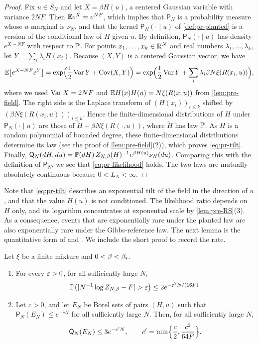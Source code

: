 \begin{proof}
Fix $u\in S_N$ and let $X=\beta H(u)$, a centered Gaussian variable with variance $2NF$. Then $\mathbb E e^{X}=e^{NF}$, which implies that $\mathsf P_N$ is a probability measure whose $u$-marginal is $\nu_N$, and that the kernel $\mathsf P_N(\cdot\mid u)$ of \cref{def:pr-planted} is a version of the conditional law of $H$ given $u$. By definition, $\mathsf P_N(\cdot\mid u)$ has density $e^{X-NF}$ with respect to $\mathbb P$. For points $x_1,\dots,x_k\in\mathbb R^N$ and real numbers $\lambda_1,\dots,\lambda_k$, let $Y=\sum_i\lambda_iH(x_i)$. Because $(X,Y)$ is a centered Gaussian vector, we have
\[
\mathbb E\bigl[e^{X-NF}e^{Y}\bigr]=\exp\Bigl(\frac12\operatorname{Var} Y+\operatorname{Cov}(X,Y)\Bigr)=\exp\Bigl(\frac12\operatorname{Var} Y+\sum_i\lambda_i\beta N\xi(R(x_i,u))\Bigr),
\]
where we used $\operatorname{Var} X=2NF$ and $\mathbb E H(x)H(u)=N\xi(R(x,u))$ from \cref{lem:pre-field}. The right side is the Laplace transform of $(H(x_i))_{i\le k}$ shifted by $(\beta N\xi(R(x_i,u)))_{i\le k}$. Hence the finite-dimensional distributions of $H$ under $\mathsf P_N(\cdot\mid u)$ are those of $\widetilde H+\beta N\xi(R(\cdot,u))$, where $\widetilde H$ has law $\mathbb P$. As $H$ is a random polynomial of bounded degree, these finite-dimensional distributions determine its law (see the proof of \cref{lem:pre-field}(2)), which proves \eqref{eq:pr-tilt}. Finally, $\mathsf Q_N(dH,du)=\mathbb P(dH)\,Z_{N,\beta}(H)^{-1}e^{\beta H(u)}\nu_N(du)$. Comparing this with the definition of $\mathsf P_N$, we see that \eqref{eq:pr-likelihood} holds. The two laws are mutually absolutely continuous because $0<L_N<\infty$.
\end{proof}

Note that \eqref{eq:pr-tilt} describes an exponential tilt of the field in the direction of $u$, and that the value $H(u)$ is not conditioned. The likelihood ratio depends on $H$ only, and its logarithm concentrates at exponential scale by \cref{lem:pre-RS}(3). As a consequence, events that are exponentially rare under the planted law are also exponentially rare under the Gibbs-reference law. The next lemma is the quantitative form of \cite[Lemma~3.5]{ElAlaouiMontanariSellke2025} and \cite[Lemma~2.3]{AuffingerElAlaouiSellke2025}. We include the short proof to record the rate.

\begin{lemma}\label{lem:pr-transfer}
Let $\xi$ be a finite mixture and $0<\beta<\beta_{\mathrm s}$.
\begin{enumerate}
\item[(a)] For every $\varepsilon>0$, for all sufficiently large $N$,
\begin{equation}\label{eq:pr-Zconc}
\Pp\bigl(|N^{-1}\log Z_{N,\beta}-F|>\eps\bigr)\le 2e^{-\eps^2N/(16F)}.
\end{equation}
\item[(b)] Let $c>0$, and let $E_N$ be Borel sets of pairs $(H,u)$ such that $\mathsf P_N(E_N)\le e^{-cN}$ for all sufficiently large $N$. Then, for all sufficiently large $N$,
\begin{equation}\label{eq:pr-transfer}
\mathsf Q_N(E_N)\le 3e^{-c'N},\qquad c'=\min\Bigl\{\frac c2,\frac{c^2}{64F}\Bigr\}.
\end{equation}
\end{enumerate}
\end{lemma}

